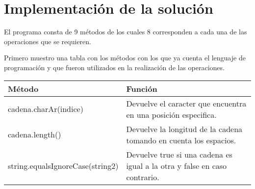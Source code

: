 \documentclass[12pt]{article}
\begin{document}
	\section{Implementación de la solución}

	El programa consta de 9 métodos de los cuales 8 corresponden 
	a cada una de las operaciones que se requieren. 

	Primero muestro una tabla con los métodos con los que ya cuenta el 
	lenguaje de programación y que fueron utilizados en la realización 
	de las operaciones.

	 \begin{table}[H]
        \begin{tabular}{|p{6.5cm}|p{9.5cm}|}
        \hline
            \textbf{Método} & \textbf{Función} \\ \hline
            cadena.charAr(indice) & Devuelve el caracter que encuentra en una posición especifica. \\ \hline
            cadena.length() & Devuelve la longitud de la cadena tomando en cuenta los espacios. \\ \hline
           	string.equalsIgnoreCase(string2) & Devuelve true si una cadena es igual a la otra y false en caso contrario. \\ \hline
        \end{tabular}
    \end{table}
\end{document}
